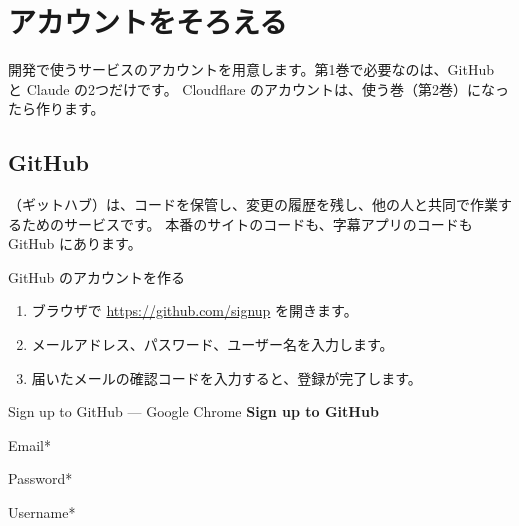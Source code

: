 \chapter{アカウントをそろえる}

開発で使うサービスのアカウントを用意します。第1巻で必要なのは、GitHub と Claude の2つだけです。
Cloudflare のアカウントは、使う巻（第2巻）になったら作ります。

\section{GitHub}

（ギットハブ）は、コードを保管し、変更の履歴を残し、他の人と共同で作業するためのサービスです。
本番のサイトのコードも、字幕アプリのコードも GitHub にあります。

\begin{step}{GitHub のアカウントを作る}
\begin{enumerate}
  \item ブラウザで \url{https://github.com/signup} を開きます。
  \item メールアドレス、パスワード、ユーザー名を入力します。
  \item 届いたメールの確認コードを入力すると、登録が完了します。
\end{enumerate}

\begin{winwin}[0.7\linewidth]{Sign up to GitHub — Google Chrome}
\centering\textbf{\large Sign up to GitHub}\par\vspace{6pt}
\raggedright
Email*\par
{}\par\vspace{3pt}
Password*\par
{}\par\vspace{3pt}
Username*\par
{}\par\vspace{6pt}
\centering\colorbox{matcha}{\color{white}}
\end{winwin}
\end{step}

